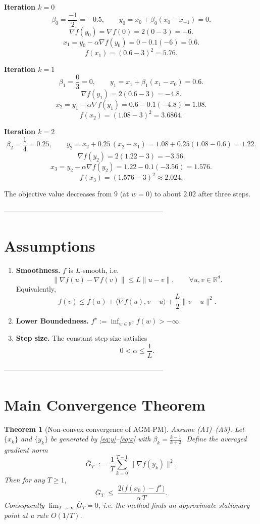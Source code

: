 \documentclass{article}
\newtheorem{theorem}{Theorem}
\begin{document}
\medskip
\noindent\textbf{Iteration $k=0$}
\[
\beta_0=\frac{-1}{2}=-0.5,\qquad
y_0 = x_0+\beta_0(x_0-x_{-1})=0.
\]
\[
\nabla f(y_0)=\nabla f(0)=2(0-3)=-6.
\]
\[
x_1 = y_0-\alpha\nabla f(y_0)=0-0.1(-6)=0.6.
\]
\[
f(x_1)= (0.6-3)^2 = 5.76.
\]

\medskip
\noindent\textbf{Iteration $k=1$}
\[
\beta_1=\frac{0}{3}=0,\qquad
y_1 = x_1+\beta_1(x_1-x_0)=0.6.
\]
\[
\nabla f(y_1)=2(0.6-3)=-4.8.
\]
\[
x_2 = y_1-\alpha\nabla f(y_1)=0.6-0.1(-4.8)=1.08.
\]
\[
f(x_2)=(1.08-3)^2 = 3.6864.
\]

\medskip
\noindent\textbf{Iteration $k=2$}
\[
\beta_2=\frac{1}{4}=0.25,\qquad
y_2 = x_2+0.25\,(x_2-x_1)=1.08+0.25(1.08-0.6)=1.22.
\]
\[
\nabla f(y_2)=2(1.22-3)=-3.56.
\]
\[
x_3 = y_2-\alpha\nabla f(y_2)=1.22-0.1(-3.56)=1.576.
\]
\[
f(x_3)=(1.576-3)^2\approx 2.024.
\]

The objective value decreases from $9$ (at $w=0$) to about $2.02$ after three steps.

--------------------------------------------------------------------

\section*{Assumptions}
\begin{enumerate}
\item \textbf{Smoothness.} $f$ is $L$‑smooth, i.e.
\[
\|\nabla f(u)-\nabla f(v)\|\le L\|u-v\|,\qquad\forall u,v\in\mathbb{R}^d. \tag{A1}
\]
Equivalently,
\[
f(v)\le f(u)+\langle\nabla f(u),v-u\rangle+\frac{L}{2}\|v-u\|^2. \tag{A1'}
\]

\item \textbf{Lower Boundedness.} $f^\star:=\inf_{w\in\mathbb{R}^d}f(w)>-\infty$. 

\item \textbf{Step size.} The constant step size satisfies
\[
0<\alpha\le\frac{1}{L}. \tag{A3}
\]
\end{enumerate}

--------------------------------------------------------------------

\section*{Main Convergence Theorem}
\begin{theorem}[Non‑convex convergence of AGM‑PM]\label{thm:main}
Assume (A1)–(A3). Let $\{x_k\}$ and $\{y_k\}$ be generated by \eqref{eq:y}–\eqref{eq:x} with $\beta_k=\frac{k-1}{k+2}$. Define the averaged gradient norm
\[
\overline{G}_T \;:=\; \frac{1}{T}\sum_{k=0}^{T-1}\|\nabla f(y_k)\|^2 .
\]
Then for any $T\ge 1$,
\[
\overline{G}_T\;\le\; \frac{2\bigl(f(x_0)-f^\star\bigr)}{\alpha\,T}. \tag{T1}
\]
Consequently $\displaystyle \lim_{T\to\infty}\overline{G}_T=0$, i.e. the method finds an \emph{approximate stationary point} at a rate $O(1/T)$.
\end{theorem}
\end{document}
